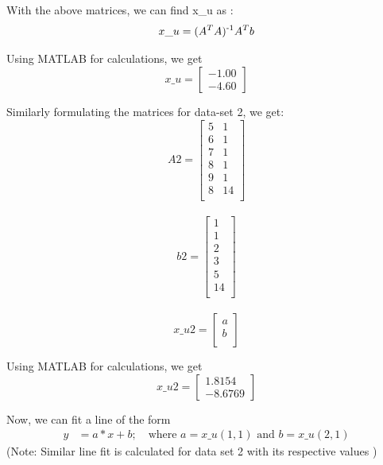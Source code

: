 \documentclass{article}
\begin{document}
With the above matrices, we can find x\_u as :
\begin{equation}
	x\_u = (A^T A)\textsuperscript{-1}A^Tb
\end{equation}

Using MATLAB for calculations, we get  \\
\[
x\_u = 
	\begin{bmatrix}
	-1.00 \\
	-4.60
	\end{bmatrix}
\]

\noindent Similarly formulating the matrices for data-set 2, we get: \\
\[
A2=
  \begin{bmatrix}
	
     5 & 1 \\
     6 & 1 \\
     7 & 1 \\
     8 & 1 \\
     9 & 1 \\
     8 & 14 \\
   \end{bmatrix}
\]
\\
\[
b2=
  \begin{bmatrix}
	1 \\
     	1 \\
     	2 \\
     	3 \\
     	5 \\  
     	14 \\  
  \end{bmatrix}
\]
\\
\[
x\_u2=
  \begin{bmatrix}
	a \\
	b \\    
  \end{bmatrix}
\]

Using MATLAB for calculations, we get  \\
\[
x\_u2 = 
	\begin{bmatrix}
	 1.8154 \\
   	-8.6769
	\end{bmatrix}
\]

\noindent Now, we can fit a line of the form 
\begin{align*}
	y &= a * x + b  ;\quad  \text{where } 
 	a = x\_u(1,1)  \text{ and } 
 	b = x\_u(2,1) 
\end{align*}
(Note: Similar line fit is calculated for data set 2 with its respective values )
\end{document}

